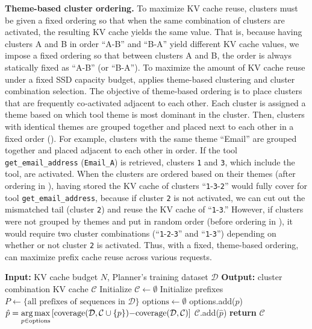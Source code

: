 {\bf Theme-based cluster ordering.}
To maximize KV cache reuse, clusters must be given a fixed ordering so that when the same combination of clusters are activated, the resulting KV cache yields the same value. That is, because having clusters A and B in order ``A-B'' and ``B-A'' yield different KV cache values, we impose a fixed ordering so that between clusters A and B, the order is always statically fixed as ``A-B'' (or ``B-A''). To maximize the amount of KV cache reuse under a fixed SSD capacity budget, \prefill applies theme-based clustering and cluster combination selection. The objective of theme‑based ordering is to place clusters that are frequently co‑activated adjacent to each other. Each cluster is assigned a theme based on which tool theme is most dominant in the cluster. Then, clusters with identical themes are grouped together and placed next to each other in a fixed order (). For example, clusters with the same theme ``Email'' are grouped together and placed adjacent to each other in order. If the tool \texttt{get\_email\_address} (\texttt{Email\_A}) is retrieved, clusters \texttt{1} and \texttt{3}, which include the tool, are activated. When the clusters are ordered based on their themes (after ordering in ), having stored the KV cache of clusters ``\texttt{1}-\texttt{3}-\texttt{2}'' would fully cover for tool \texttt{get\_email\_address}, because if cluster \texttt{2} is not activated, we can cut out the mismatched tail (cluster \texttt{2}) and reuse the KV cache of ``\texttt{1}-\texttt{3}.'' However, if clusters were not grouped by themes and put in random order (before ordering in ), it would require two cluster combinations (``\texttt{1}-\texttt{2}-\texttt{3}'' and ``\texttt{1}-\texttt{3}'') depending on whether or not cluster \texttt{2} is activated. Thus, with a fixed, theme-based ordering, \prefill can maximize prefix cache reuse across various requests.


\begingroup
\begin{algorithm}[t]
\caption{Cluster combination selection}
\label{algo:greedy_selection}
\begin{algorithmic}[1]
\footnotesize
  \STATE \textbf{Input:} KV cache budget $N$, Planner's training dataset $\mathcal{D}$
  \STATE \textbf{Output:} cluster combination KV cache $\mathcal{C}$
  \STATE Initialize $\mathcal{C} \gets \emptyset$
  \STATE Initialize prefixes $P \gets \{\text{all prefixes of sequences in }\mathcal{D}\}$
    \STATE $\mathrm{options}\gets \emptyset$
        \STATE options.add($p$)
      \ENDIF
    \ENDFOR
    \STATE $\hat{p}=\displaystyle\operatorname*{arg\,max}_{p \in \mathrm{options}} \left[ \mathrm{coverage}(\mathcal{D}, \mathcal{C}\cup\{p\}) {-} \mathrm{coverage}(\mathcal{D}, \mathcal{C}) \right]$
    \STATE $\mathcal{C}$.add($\hat{p}$)
  \ENDFOR
  \STATE \textbf{return} $\mathcal{C}$
\end{algorithmic}
\end{algorithm}
\endgroup


